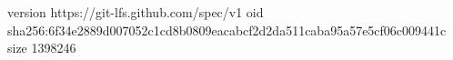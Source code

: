 version https://git-lfs.github.com/spec/v1
oid sha256:6f34e2889d007052c1cd8b0809eacabcf2d2da511caba95a57e5cf06c009441c
size 1398246
